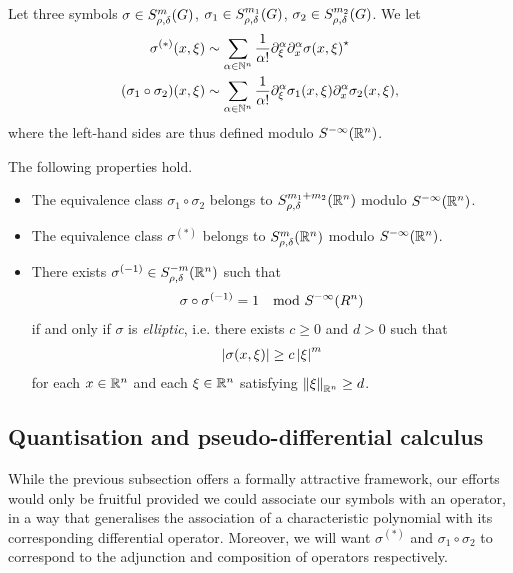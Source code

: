 \begin{theorem}
    Let three symbols
    $\sigma \in \SymbolClass m {\rho, \delta}$,
    $\sigma_1 \in \SymbolClass {m_1} {\rho, \delta}$,
    $\sigma_2 \in \SymbolClass {m_2} {\rho, \delta}$.
    We let
    \begin{align*}
        \sigma^{(*)}(x, \xi) &\sim \sum_{\alpha \in \N^n} \frac 1 {\alpha!} \iD{\xi^\alpha} \iD{x^\alpha} \adj{\sigma(x, \xi)}\\
        (\sigma_1 \circ \sigma_2)(x, \xi) &\sim \sum_{\alpha \in \N^n} \frac 1 {\alpha!} \iD{\xi^\alpha} \sigma_1(x, \xi) \iD{x^\alpha} \sigma_2(x, \xi),
    \end{align*}
    where the left-hand sides are thus defined modulo $\SmoothingSymbols [\R^n]$.

    The following properties hold.
    \begin{itemize}
        \item The equivalence class $\sigma_1 \circ \sigma_2$ belongs to $\SymbolClass [\R^n] {m_1 + m_2} {\rho, \delta}$ modulo $\SmoothingSymbols [\R^n]$.
        \item The equivalence class $\sigma^{(*)}$ belongs to $\SymbolClass [\R^n] m {\rho, \delta}$ modulo $\SmoothingSymbols [\R^n]$.
        \item
            There exists $\sigma^{(-1)} \in \SymbolClass [\R^n] {-m} {\rho, \delta}$ such that
            \begin{align*}
                \sigma \circ \sigma^{(-1)} = 1 \quad \text{mod } \SmoothingSymbols [R^n]
            \end{align*}
            if and only if $\sigma$ is \emph{elliptic},
            i.e. there exists $c \geq 0$ and $d > 0$ such that
            \begin{align*}
                \abs {\sigma(x, \xi)} \geq c \abs \xi^m
            \end{align*}
            for each $x \in \R^n$ and each $\xi \in \R^n$ satisfying $\norm [\R^n] \xi \geq d$.
    \end{itemize}
\end{theorem}

\subsection{Quantisation and pseudo-differential calculus}

While the previous subsection offers a formally attractive framework,
our efforts would only be fruitful
provided we could associate our symbols with an operator,
in a way that generalises the association of a characteristic polynomial with its corresponding differential operator.
Moreover, we will want $\sigma^{(*)}$ and $\sigma_1 \circ \sigma_2$ to correspond to the adjunction and composition of operators respectively.

